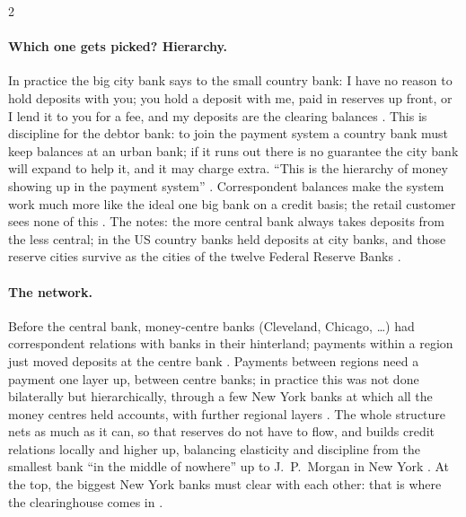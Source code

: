 \begin{paracol}{2}
\paragraph{Which one gets picked? Hierarchy.} In practice the big city bank says to the small country bank: I have no reason to hold deposits
with you; you hold a deposit with me, paid in reserves up front, or I lend it to you for a fee, and my deposits are the clearing balances
. This is discipline for the debtor bank: to join the payment system a country bank must keep balances at an urban
bank; if it runs out there is no guarantee the city bank will expand to help it, and it may charge extra. ``This is the hierarchy of money
showing up in the payment system'' . Correspondent balances make the system work much more like the ideal one big
bank on a credit basis; the retail customer sees none of this . The notes: the more central bank always takes deposits from the
less central; in the US country banks held deposits at city banks, and those reserve cities survive as the cities of the twelve Federal Reserve Banks
.

\paragraph{The network.} Before the central bank, money-centre banks (Cleveland, Chicago, \dots) had correspondent relations with banks in their
hinterland; payments within a region just moved deposits at the centre bank . Payments between regions need a payment
one layer up, between centre banks; in practice this was not done bilaterally but hierarchically, through a few New York banks at which all the
money centres held accounts, with further regional layers . The whole structure nets as
much as it can, so that reserves do not have to flow, and builds credit relations locally and higher up, balancing elasticity and discipline from
the smallest bank ``in the middle of nowhere'' up to J.~P.~Morgan in New York . At the top, the biggest New York banks
must clear with each other: that is where the clearinghouse comes in .


\end{paracol}
